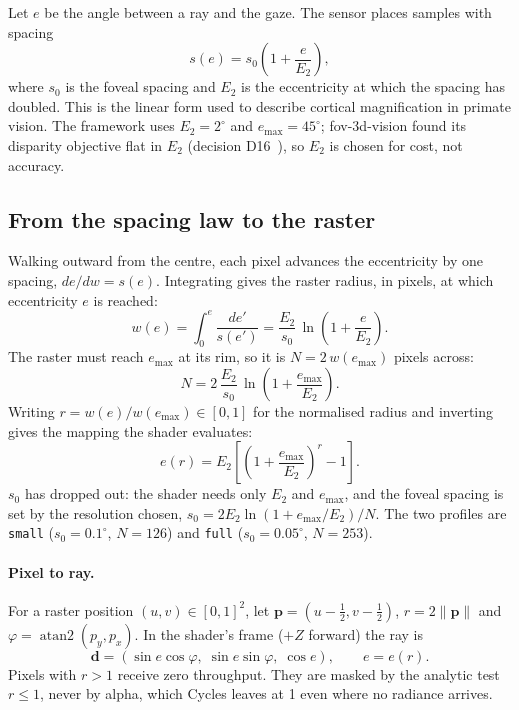 \documentclass[11pt,a4paper]{article}
\newcommand{\code}[1]{\texttt{\small #1}}
\newcommand{\vb}[1]{\mathbf{#1}}
\newcommand{\emax}{e_{\max}}
\DeclareMathOperator{\atantwo}{atan2}
\begin{document}
Let $e$ be the angle between a ray and the gaze. The sensor places samples with spacing
\begin{equation}\label{eq:spacing}
s(e) = s_0\left(1 + \frac{e}{E_2}\right),
\end{equation}
where $s_0$ is the foveal spacing and $E_2$ is the eccentricity at which the spacing has doubled. This is the
linear form used to describe cortical magnification in primate vision. The framework uses $E_2 = 2^\circ$ and
$\emax = 45^\circ$; fov-3d-vision found its disparity objective flat in $E_2$ (decision D16~\cite{fov3dDec}), so
$E_2$ is chosen for cost, not accuracy.

\subsection{From the spacing law to the raster}\label{sec:raster}

Walking outward from the centre, each pixel advances the eccentricity by one spacing, $de/dw = s(e)$. Integrating
gives the raster radius, in pixels, at which eccentricity $e$ is reached:
\begin{equation}\label{eq:w}
w(e) = \int_0^{e} \frac{de'}{s(e')} = \frac{E_2}{s_0}\,\ln\!\left(1 + \frac{e}{E_2}\right).
\end{equation}
The raster must reach $\emax$ at its rim, so it is $N = 2\,w(\emax)$ pixels across:
\begin{equation}\label{eq:N}
N = 2\,\frac{E_2}{s_0}\,\ln\!\left(1 + \frac{\emax}{E_2}\right).
\end{equation}
Writing $r = w(e)/w(\emax) \in [0,1]$ for the normalised radius and inverting gives the mapping the shader
evaluates:
\begin{equation}\label{eq:er}
e(r) = E_2\left[\left(1 + \frac{\emax}{E_2}\right)^{r} - 1\right].
\end{equation}
$s_0$ has dropped out: the shader needs only $E_2$ and $\emax$, and the foveal spacing is set by the resolution
chosen, $s_0 = 2E_2\ln(1 + \emax/E_2)/N$. The two profiles are \code{small} ($s_0 = 0.1^\circ$, $N = 126$) and
\code{full} ($s_0 = 0.05^\circ$, $N = 253$).

\paragraph{Pixel to ray.} For a raster position $(u,v)\in[0,1]^2$, let $\vb{p} = (u - \tfrac12, v - \tfrac12)$,
$r = 2\lVert\vb{p}\rVert$ and $\varphi = \atantwo(p_y, p_x)$. In the shader's frame ($+Z$ forward) the ray is
\begin{equation}\label{eq:dir}
\vb{d} = (\sin e\cos\varphi,\; \sin e\sin\varphi,\; \cos e), \qquad e = e(r).
\end{equation}
Pixels with $r > 1$ receive zero throughput. They are masked by the analytic test $r \le 1$, never by alpha, which
Cycles leaves at 1 even where no radiance arrives.
\end{document}
